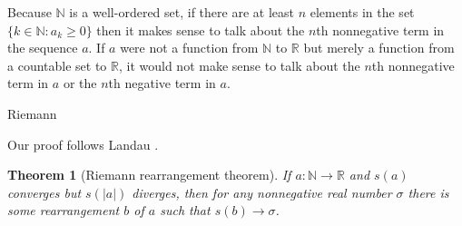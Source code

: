 \documentclass{article}
\newtheorem{theorem}{Theorem}
\begin{document}
Because $\mathbb{N}$ is a well-ordered set, if there are at least $n$ elements in the set $\{k \in \mathbb{N}: a_k \geq 0\}$ then it makes
sense to talk about the $n$th nonnegative term in the sequence $a$. If $a$ were not a function from $\mathbb{N}$ to $\mathbb{R}$ but merely
a function from a countable set to $\mathbb{R}$, it would not make sense to talk about the $n$th nonnegative term in $a$ or the $n$th negative
term in $a$.


Riemann \cite[pp.~96-97]{riemann}

Our proof follows Landau \cite[p.~158, Theorem 217]{landau}.



\begin{theorem}[Riemann rearrangement theorem]
If $a:\mathbb{N} \to \mathbb{R}$ and $s(a)$ converges but $s(|a|)$ diverges, then
 for any nonnegative real number $\sigma$ there is some rearrangement $b$ of $a$ such that $s(b) \to \sigma$.
\end{theorem}
\end{document}
